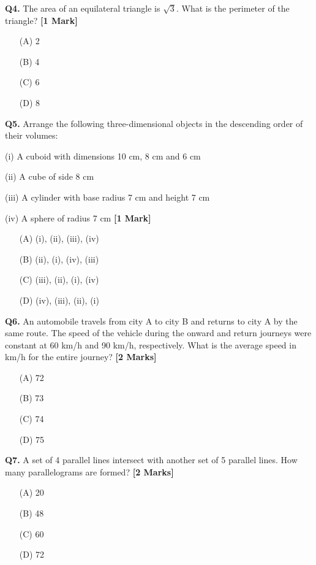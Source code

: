 \documentclass[11pt]{article}
\newcommand{\questiona}[2]{
    \noindent\textbf{Q#2.} #1 \hfill \textbf{[1 Mark]}
}
\newcommand{\questionb}[2]{
    \noindent\textbf{Q#2.} #1 \hfill \textbf{[2 Marks]}
}
\begin{document}
\questiona{The area of an equilateral triangle is \(\sqrt{3}\). What is the perimeter of the triangle?}{4}
\begin{enumerate}
    \item[(A)] 2  
    \item[(B)] 4  
    \item[(C)] 6  
    \item[(D)] 8  
\end{enumerate}
\vspace{0.5cm}

\questiona{Arrange the following three-dimensional objects in the descending order of their volumes:

(i) A cuboid with dimensions 10 cm, 8 cm and 6 cm 

(ii) A cube of side 8 cm 

(iii) A cylinder with base radius 7 cm and height 7 cm 

(iv) A sphere of radius 7 cm}{5}
\begin{enumerate}
    \item[(A)] (i), (ii), (iii), (iv)  
    \item[(B)] (ii), (i), (iv), (iii)  
    \item[(C)] (iii), (ii), (i), (iv)  
    \item[(D)] (iv), (iii), (ii), (i)  
\end{enumerate}
\vspace{0.5cm}

\questionb{An automobile travels from city A to city B and returns to city A by the same route. The speed of the vehicle during the onward and return journeys were constant at 60 km/h and 90 km/h, respectively. What is the average speed in km/h for the entire journey?}{6}
\begin{enumerate}
    \item[(A)] 72  
    \item[(B)] 73  
    \item[(C)] 74  
    \item[(D)] 75  
\end{enumerate}
\vspace{0.5cm}

\questionb{A set of 4 parallel lines intersect with another set of 5 parallel lines. How many parallelograms are formed?}{7}
\begin{enumerate}
    \item[(A)] 20  
    \item[(B)] 48  
    \item[(C)] 60  
    \item[(D)] 72  
\end{enumerate}
\vspace{0.5cm}
\end{document}
